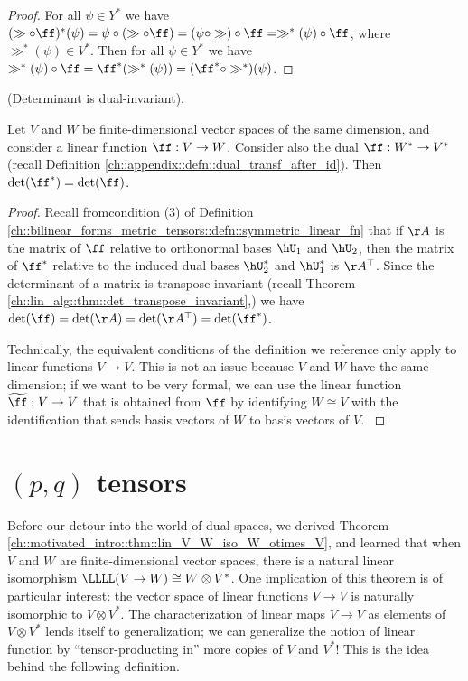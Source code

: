 \begin{proof}
    For all $\psi \in Y^*$ we have $(\gg \circ \ff)^*(\psi) = \psi \circ (\gg \circ \ff) = (\psi \circ \gg) \circ \ff = \gg^*(\psi) \circ \ff$, where $\gg^*(\psi) \in V^*$. Then for all $\psi \in Y^*$ we have $\gg^*(\psi) \circ \ff = \ff^*(\gg^*(\psi)) = (\ff^* \circ \gg^*)(\psi)$.
\end{proof}

\begin{theorem}
\label{ch::lin_alg::rmk::det_dual_invariant}
    (Determinant is dual-invariant).
    
    Let $V$ and $W$ be finite-dimensional vector spaces of the same dimension, and consider a linear function $\ff:V \rightarrow W$. Consider also the dual $\ff:W^* \rightarrow V^*$ (recall Definition \ref{ch::appendix::defn::dual_transf_after_id}). Then $\det(\ff^*) = \det(\ff)$.
\end{theorem}

\begin{proof}
    Recall from\footnotemark condition (3) of Definition \ref{ch::bilinear_forms_metric_tensors::defn::symmetric_linear_fn} that if $\AA$ is the matrix of $\ff$ relative to orthonormal bases $\hU_1$ and $\hU_2$, then the matrix of $\ff^*$ relative to the induced dual bases $\hU_2^*$ and $\hU_1^*$ is $\AA^\top$. Since the determinant of a matrix is transpose-invariant (recall Theorem \ref{ch::lin_alg::thm::det_transpose_invariant},) we have $\det(\ff) = \det(\AA) = \det(\AA^\top) = \det(\ff^*)$.

    \footnotetext
    {
        Technically, the equivalent conditions of the definition we reference only apply to linear functions $V \rightarrow V$. This is not an issue because $V$ and $W$ have the same dimension; if we want to be very formal, we can use the linear function $\widetilde{\ff}:V \rightarrow V$ that is obtained from $\ff$ by identifying $W \cong V$ with the identification that sends basis vectors of $W$ to basis vectors of $V$.
    }
\end{proof}

\section{$(p, q)$ tensors}

Before our detour into the world of dual spaces, we derived Theorem \ref{ch::motivated_intro::thm::lin_V_W_iso_W_otimes_V}, and learned that when $V$ and $W$ are finite-dimensional vector spaces, there is a natural linear isomorphism $\LLLL(V \rightarrow W) \cong W \otimes V^*$. One implication of this theorem is of particular interest: the vector space of linear functions $V \rightarrow V$ is naturally isomorphic to $V \otimes V^*$. The characterization of linear maps $V \rightarrow V$ as elements of $V \otimes V^*$ lends itself to generalization; we can generalize the notion of linear function by ``tensor-producting in'' more copies of $V$ and $V^*$! This is the idea behind the following definition.

